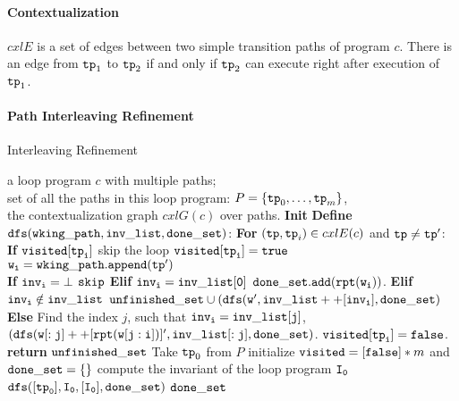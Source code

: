 \paragraph{Contextualization}

$cxlE$ is a set of edges between two simple transition paths of program $c$. There is an edge from $\mathtt{tp}_1$ to $\mathtt{tp}_2$
if and only if $\mathtt{tp}_2$ can execute right after execution of $\mathtt{tp}_1$.

\paragraph{Path Interleaving Refinement}

  \begin{algorithm}
    \caption{
    {Interleaving Refinement}
    \label{alg:prog-refine}
    }
    \begin{algorithmic}[1]
    \REQUIRE a loop program $c$ with multiple paths;
    \\
    set of all the paths in this loop program:
    $P = \{\mathtt{tp}_0, \ldots, \mathtt{tp}_m\}$,
    \\
    the contextualization graph $cxlG(c)$ over paths.
    \STATE  \textbf{Init} 
    \STATE \textbf{Define} {$\mathtt{dfs(wking\_path, inv\_list, done\_set)}$:}
    \STATE {}
    \STATE {}
    \STATE \quad \textbf{For} $(\mathtt{tp}, \mathtt{tp}_i) \in cxlE(c)$ and $\mathtt{tp} \neq \mathtt{tp}'$:
    \\
    \STATE \quad \quad \textbf{If} {$\mathtt{visited[\mathtt{tp}_i]}$} skip the loop
    \STATE \quad \quad $\mathtt{visited[\mathtt{tp}_i]} = \mathtt{true}$
    \STATE \quad \quad $\mathtt{w_i = wking\_path.append(\mathtt{tp}')}$
    \\
    \quad {}
    \STATE \quad \quad \textbf{If} {$\mathtt{inv_i = \bot}$} $\mathtt{skip}$
    \STATE \quad \quad \textbf{Elif} {$\mathtt{inv_i = inv\_list[0]}$} $\mathtt{done\_set.add(\mathtt{rpt}(w_i))}$.
    \STATE \quad \quad \textbf{Elif} {$\mathtt{inv_i \notin inv\_list}$} 
    $\mathtt{unfinished\_set \cup (dfs(w', inv\_list++[inv_i], done\_set)}$
    \STATE \quad \quad \textbf{Else} 
    Find the index $j$, such that $\mathtt{inv_i = inv\_list[j] }$,
    \STATE \quad \quad \quad
    $\mathtt{(dfs(w[:j]++[\mathtt{rpt}(w[j:i])]', inv\_list[:j], done\_set)}$.
    \STATE \quad \quad $\mathtt{visited[\mathtt{tp}_i]} = \mathtt{false}$.
    \STATE \quad \textbf{return} $\mathtt{unfinished\_set}$
    \STATE Take $\mathtt{tp}_0$ from $P$ 
    \STATE initialize $\mathtt{visited} = [\mathtt{false}]*m$ and $\mathtt{done\_set = \{\}}$
    \STATE compute the invariant of the loop program $\mathtt{I_0}$
    \STATE $\mathtt{dfs([\mathtt{tp}_0], I_0, [I_0], done\_set )}$
    \RETURN $\mathtt{done\_set}$
    \end{algorithmic}
    \end{algorithm}



